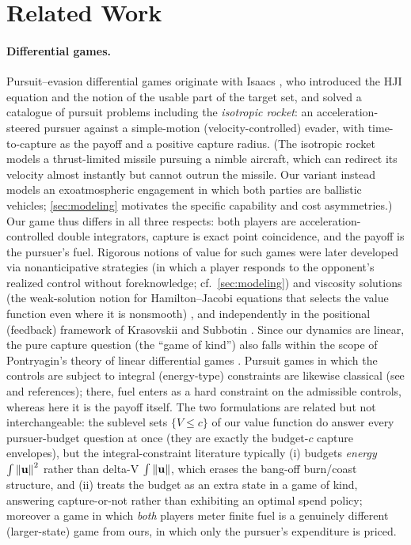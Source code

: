 \documentclass{article}
\renewcommand{\vec}[1]{\mathbf{#1}}
\theoremstyle{remark}
\begin{document}
\section{Related Work}
\label{sec:related}

\paragraph{Differential games.}
Pursuit--evasion differential games originate with Isaacs \cite{isaacs1965},
who introduced the HJI equation and the notion of the usable part of the
target set, and solved a catalogue of pursuit problems including the
\emph{isotropic rocket}: an acceleration-steered pursuer against a
simple-motion (velocity-controlled) evader, with time-to-capture as the
payoff and a positive capture radius.  (The isotropic rocket models a
thrust-limited missile pursuing a nimble aircraft, which can redirect its
velocity almost instantly but cannot outrun the missile.  Our variant instead
models an exoatmospheric engagement in which both parties are ballistic
vehicles; \cref{sec:modeling} motivates the specific capability and cost
asymmetries.)  Our game thus differs in all three respects: both players are
acceleration-controlled double integrators, capture is exact point
coincidence, and the payoff is the pursuer's fuel.  Rigorous notions of value
for such games were later developed via nonanticipative strategies (in which
a player responds to the opponent's realized control without foreknowledge;
cf.\ \cref{sec:modeling}) and viscosity solutions (the weak-solution notion
for Hamilton--Jacobi equations that selects the value function even where it
is nonsmooth) \cite{crandalllions1983,evanssouganidis1984,bardi1997}, and
independently in the positional (feedback) framework of Krasovskii and
Subbotin \cite{krasovskii1988}.  Since our dynamics are linear, the pure
capture question (the ``game of kind'') also falls within the scope of
Pontryagin's theory of linear differential games \cite{pontryagin1967}.
Pursuit games in which the controls are subject to integral (energy-type)
constraints are likewise classical (see \cite{krasovskii1988} and
references); there, fuel enters as a hard constraint on the admissible
controls, whereas here it is the payoff itself.  The two formulations are
related but not interchangeable: the sublevel sets $\{V \le c\}$ of our value
function do answer every pursuer-budget question at once (they are exactly
the budget-$c$ capture envelopes), but the integral-constraint literature
typically (i) budgets \emph{energy} $\int \norm{\vec u}^2$ rather than
delta-V $\int \norm{\vec u}$, which erases the bang-off burn/coast structure,
and (ii) treats the budget as an extra state in a game of kind, answering
capture-or-not rather than exhibiting an optimal spend policy; moreover a
game in which \emph{both} players meter finite fuel is a genuinely different
(larger-state) game from ours, in which only the pursuer's expenditure is
priced.
\end{document}
